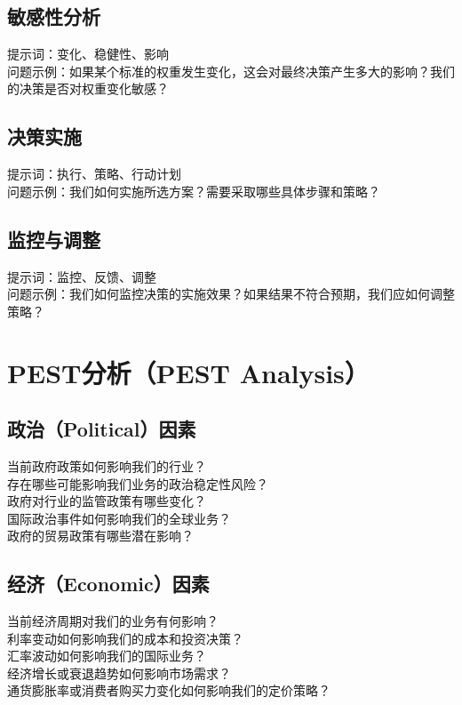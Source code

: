 \documentclass[12pt]{book}
\begin{document}
\subsection{敏感性分析}
提示词：变化、稳健性、影响\\
问题示例：如果某个标准的权重发生变化，这会对最终决策产生多大的影响？我们的决策是否对权重变化敏感？\\

\subsection{决策实施}
提示词：执行、策略、行动计划\\
问题示例：我们如何实施所选方案？需要采取哪些具体步骤和策略？\\

\subsection{监控与调整}
提示词：监控、反馈、调整\\
问题示例：我们如何监控决策的实施效果？如果结果不符合预期，我们应如何调整策略？\\

\section{PEST分析（PEST Analysis）}
\subsection{政治（Political）因素}
当前政府政策如何影响我们的行业？\\
存在哪些可能影响我们业务的政治稳定性风险？\\
政府对行业的监管政策有哪些变化？\\
国际政治事件如何影响我们的全球业务？\\
政府的贸易政策有哪些潜在影响？\\

\subsection{经济（Economic）因素}
当前经济周期对我们的业务有何影响？\\
利率变动如何影响我们的成本和投资决策？\\
汇率波动如何影响我们的国际业务？\\
经济增长或衰退趋势如何影响市场需求？\\
通货膨胀率或消费者购买力变化如何影响我们的定价策略？\\
\end{document}
